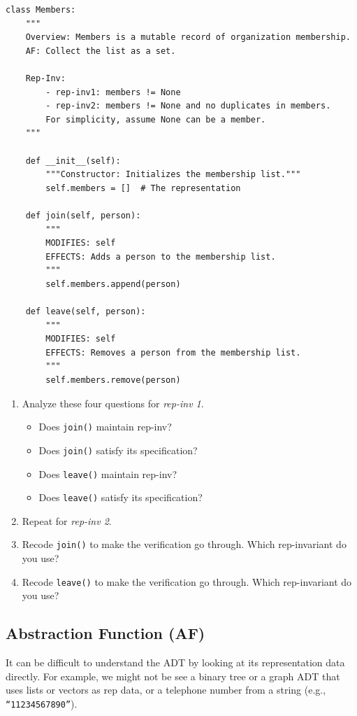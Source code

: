 \documentclass[oneside,11pt,dvipsnames]{book}
\newcommand{\code}[1]{\texttt{#1}}
\begin{document}
\begin{lstlisting}
class Members:
    """
    Overview: Members is a mutable record of organization membership.
    AF: Collect the list as a set.
    
    Rep-Inv:
        - rep-inv1: members != None
        - rep-inv2: members != None and no duplicates in members.
        For simplicity, assume None can be a member.
    """

    def __init__(self):
        """Constructor: Initializes the membership list."""
        self.members = []  # The representation

    def join(self, person):
        """
        MODIFIES: self
        EFFECTS: Adds a person to the membership list.
        """
        self.members.append(person)

    def leave(self, person):
        """
        MODIFIES: self
        EFFECTS: Removes a person from the membership list.
        """
        self.members.remove(person)
\end{lstlisting}

\begin{enumerate}
\item Analyze these four questions for \emph{rep-inv 1}.
\begin{itemize}
    \item Does \code{join()} maintain rep-inv?
    \item Does \code{join()} satisfy its specification?
    \item Does \code{leave()} maintain rep-inv?
    \item Does \code{leave()} satisfy its specification?
\end{itemize}
\item Repeat for \emph{rep-inv 2}.
\item Recode \code{join()} to make the verification go through. Which rep-invariant do you use?
\item Recode \code{leave()} to make the verification go through. Which rep-invariant do you use?
\end{enumerate}

\subsection{Abstraction Function (AF)} 

It can be difficult to understand the ADT by looking at its representation data directly. For example, we might not be see a binary tree or a graph ADT that uses lists or vectors as rep data, or a telephone number from a string (e.g., \code{``11234567890''}).
\end{document}
